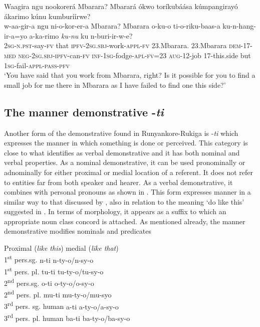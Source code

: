 \documentclass[output=paper 		  ]{langscibook}
\begin{document}
\ea%
    \label{ex:asiimwe:24}
    Waagira ngu nookorerá Mbarara? Mbarará ókwo toríkubáása kúmpangirayó ákarimo kúnu kumburíírwe?\\
 \gll  w-aa-gir-a  ngu  ni-o-kor-er-a  Mbarara?  Mbarara o-ku-o  ti-o-riku-baas-a  ku-n-hang-ir-a=yo  a-ka-rimo \emph{ku-nu}  ku  n-buri-ir-w-e?\\
2\textsc{sg-n.pst-}say-\textsc{fv}  that  \textsc{ipfv}{}-\textsc{2sg.sbj-}work-\textsc{appl-fv}  23.Mbarara.  23.Mbarara  \textsc{dem-17-med}  \textsc{neg-2sg.sbj-ipfv}{}-can-\textsc{fv}  \textsc{inf-1sg}{}-fodge-\textsc{apl-fv}=23  \textsc{aug}{}-12-job 17-this.side  but  1\textsc{sg}{}-fail-\textsc{appl-pass-pfv}\\
\glt ‘You have said that you work from Mbarara, right? Is it possible for you to find a small job for me there in Mbarara as I have failed to find one this side?’
\z

\subsection{The manner demonstrative -\textit{ti}}\label{sec:asiimwe:2.6}

Another form of the demonstrative found in Run\-yan\-ko\-re-Ru\-ki\-ga is -\textit{ti} which expresses the manner in which something is done or perceived. This category is close to what \citet{Dixon2003} identifies as verbal demonstrative and it has both nominal and verbal properties. As a nominal demonstrative, it can be used pronominally or adnominally for either proximal or medial location of a referent. It does not refer to entities far from both speaker and hearer. As a verbal demonstrative, it combines with personal pronouns as shown in . This form expresses manner in a similar way to that discussed by \citet{Guérin2015}, also in relation to the meaning ‘do like this’ suggested in \citet[72]{Dixon2003}. In terms of morphology, it appears as a suffix to which an appropriate noun class concord is attached. As mentioned already, the manner demonstrative modifies nominals  and predicates 

\ea%
    \label{ex:asiimwe:25}
 \glllllll {}  {Proximal (\textit{like this})}  {medial  (\textit{like that})}\\
    {1\textsuperscript{st}  pers.sg.}    n-ti      n-ty-o/n-sy-o\footnotemark{}\\
    {1\textsuperscript{st}  pers. pl.}    tu-ti      tu-ty-o/tu-sy-o\\
    {2\textsuperscript{nd}  pers.sg.}     o-ti      o-ty-o/o-sy-o\\
    {2\textsuperscript{nd} pers. pl.}    mu-ti      mu-ty-o/mu-syo\\
    {3\textsuperscript{rd} pers. sg. human\footnotemark{}}   a-ti       a-ty-o/a-sy-o\\
    {3\textsuperscript{rd} pers. pl. human}   ba-ti      ba-ty-o/ba-sy-o\\
\z
{}
\end{document}
